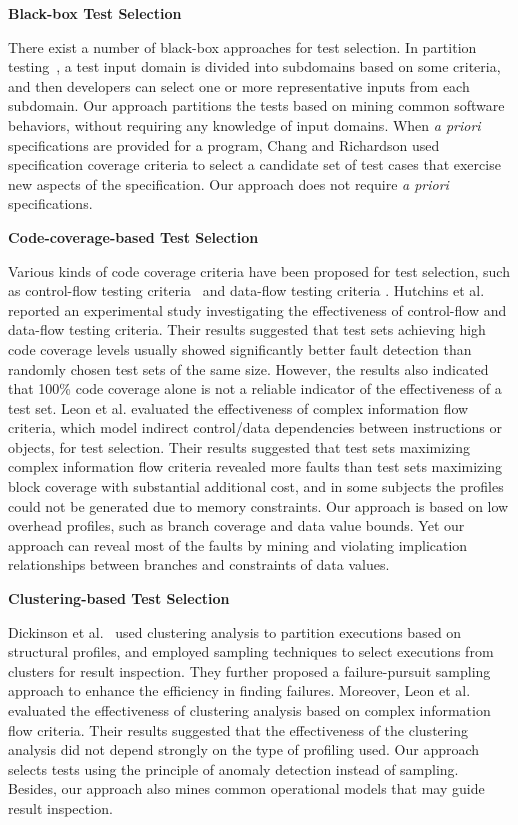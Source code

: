 \documentclass{sig-alternate}
\begin{document}
\textbf{Black-box Test Selection}



There exist a number of  black-box approaches for test selection. In
partition testing~\cite{Myers79}, a test input domain is divided
into subdomains based on some criteria, and then developers can
select one or more representative inputs from each subdomain. Our
approach partitions the tests based on mining common software
behaviors, without requiring any knowledge of input domains. When
\emph{a priori} specifications are provided for a program, Chang and
Richardson \cite{Chang99} used specification coverage criteria to
select a candidate set of test cases that exercise new aspects of
the specification. Our approach does not require \emph{a priori}
specifications.


\textbf{Code-coverage-based Test Selection}

Various kinds of code coverage criteria have been proposed for test
selection, such as control-flow testing criteria~\cite{Huang75} and
data-flow testing criteria \cite{Frankl88}. Hutchins et al.
\cite{Hutchins94} reported an experimental study investigating the
effectiveness of control-flow and data-flow testing criteria. Their
results suggested that test sets achieving high code coverage levels
usually showed significantly better fault detection than randomly
chosen test sets of the same size. However, the results also
indicated that 100\% code coverage alone is not a reliable indicator
of the effectiveness of a test set. Leon et al. \cite{Leon05}
evaluated the effectiveness of complex information flow criteria,
which model indirect control/data dependencies between instructions
or objects, for test selection. Their results suggested that test
sets maximizing complex information flow criteria revealed more
faults than test sets maximizing block coverage with substantial
additional cost, and in some subjects the profiles could not be
generated due to memory constraints. Our approach is based on low
overhead profiles, such as branch coverage and data value bounds.
Yet our approach can reveal most of the faults by mining and
violating implication relationships between branches and constraints
of data values.

\textbf{Clustering-based Test Selection}

Dickinson et al.~\cite{Dickinson01a} used clustering analysis to
partition executions based on structural profiles, and employed
sampling techniques to select executions from clusters for result
inspection. They further proposed a failure-pursuit sampling
approach \cite{Dickinson01b} to enhance the efficiency in finding
failures. Moreover, Leon et al. \cite{Leon05} evaluated the
effectiveness of clustering analysis based on complex information
flow criteria. Their results suggested that the effectiveness of the
clustering analysis did not depend strongly on the type of profiling
used. Our approach selects tests using the principle of anomaly
detection instead of sampling. Besides, our approach also mines
common operational models that may guide result inspection.
\end{document}
